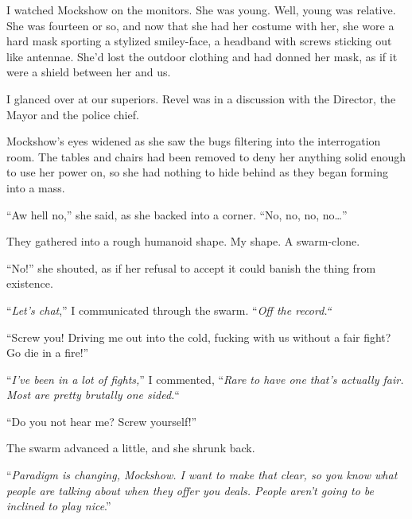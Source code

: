 \blacksquare



I watched Mockshow on the monitors.  She was young.  Well, young was relative.  She was fourteen or so, and now that she had her costume with her, she wore a hard mask sporting a stylized smiley-face, a headband with screws sticking out like antennae.  She'd lost the outdoor clothing and had donned her mask, as if it were a shield between her and us.



I glanced over at our superiors.  Revel was in a discussion with the Director, the Mayor and the police chief.



Mockshow's eyes widened as she saw the bugs filtering into the interrogation room.  The tables and chairs had been removed to deny her anything solid enough to use her power on, so she had nothing to hide behind as they began forming into a mass.



``Aw hell no,'' she said, as she backed into a corner.  ``No, no, no, no\ldots''



They gathered into a rough humanoid shape.  My shape.  A swarm-clone.



``No!'' she shouted, as if her refusal to accept it could banish the thing from existence.



``\emph{Let's chat},'' I communicated through the swarm.  ``\emph{Off the record.}\emph{``}



``Screw you!  Driving me out into the cold, fucking with us without a fair fight?  Go die in a fire!''



``\emph{I've been in a lot of fights,}'' I commented, ``\emph{Rare to have one that's actually fair.  Most are pretty brutally one sided.}``



``Do you not hear me?  Screw yourself!''



The swarm advanced a little, and she shrunk back.



``\emph{Paradigm is changing, Mockshow.  I want to make that clear, so you know what people are talking about when they offer you deals.  People aren't going to be inclined to play nice}.''



